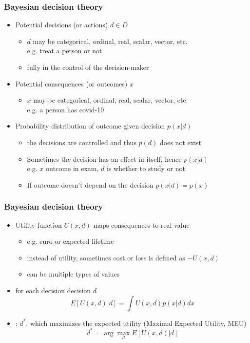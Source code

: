 \documentclass[10pt]{beamer}
\begin{document}
\begin{frame}
\frametitle{Bayesian decision theory}

  \begin{itemize}
  \item Potential decisions (or actions) $d \in D$
    \begin{itemize}
      \item $d$ may be categorical, ordinal, real, scalar, vector, etc.\\e.g. treat a person or not
      \pause
      \item fully in the control of the decision-maker
    \end{itemize}
  \pause
  \item<+-> Potential consequences (or outcomes) $x$
    \begin{itemize}
      \item $x$ may be categorical, ordinal, real, scalar, vector, etc.\\e.g. a person has covid-19
    \end{itemize}
    \pause
  \item<+-> Probability distribution of outcome given decision $p(x|d)$
    \begin{itemize}
    \item the decisions are controlled and thus $p(d)$ does not exist \pause
    \item Sometimes the decision has an effect in itself, hence $p(x|d)$\\
    e.g. $x$ outcome in exam, $d$ is whether to study or not
    \item If outcome doesn't depend on the decision $p(x|d) = p(x)$
    \end{itemize}
  \end{itemize}

\end{frame}


\begin{frame}
\frametitle{Bayesian decision theory}

  \begin{itemize}
  \item Utility function $U(x, d)$ maps consequences to real value
    \begin{itemize}
      \item e.g. euro or expected lifetime
      \item instead of utility, sometimes cost or loss is defined as $-U(x, d)$
      \item can be multiple types of values
    \end{itemize}
  \pause
  \item {} for each decision decision $d$
  \[
  E[U(x, d)|d]=\int U(x, d) p(x|d) dx
  \]
  \pause
  \item<+-> : $d^*$, which maximizes the expected utility (Maximal Expected Utility, MEU)
    \begin{equation*}
      d^*=\arg\max_d E[U(x, d)|d]
    \end{equation*}
  \end{itemize}

\end{frame}
\end{document}
